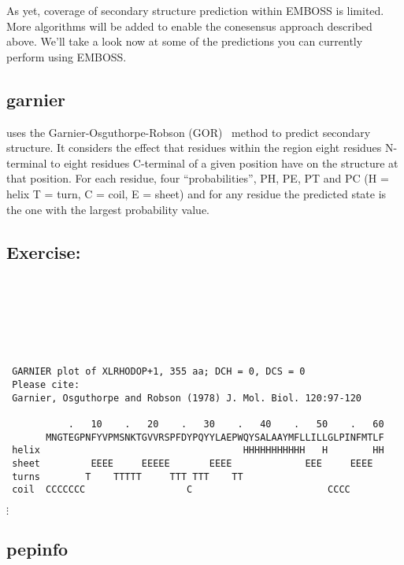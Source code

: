 \documentclass[12pt]{report}
\begin{document}
As yet, coverage of secondary structure prediction within EMBOSS is
limited. More algorithms will be added to enable the conesensus
approach described above. We'll take a look now at some of the
predictions you can currently perform using EMBOSS.

\subsection{garnier}

 uses the Garnier-Osguthorpe-Robson (GOR)~\cite{Garnier:78} 
method to predict 
secondary structure. It considers the effect that residues within the
region eight residues N-terminal to eight residues C-terminal of a
given position have on the structure at that position.  For each
residue, four ``probabilities'', PH, PE, PT and PC (H = helix T = turn,
C = coil, E = sheet) and for any residue the predicted state is the
one with the largest probability value.

\subsection*{Exercise: }

\unix{}\\
\\
\\
\\
\\

\unix{}
\begin{verbatim}
 GARNIER plot of XLRHODOP+1, 355 aa; DCH = 0, DCS = 0
 Please cite:
 Garnier, Osguthorpe and Robson (1978) J. Mol. Biol. 120:97-120

           .   10    .   20    .   30    .   40    .   50    .   60
       MNGTEGPNFYVPMSNKTGVVRSPFDYPQYYLAEPWQYSALAAYMFLLILLGLPINFMTLF
 helix                                    HHHHHHHHHHH   H        HH
 sheet         EEEE     EEEEE       EEEE             EEE     EEEE  
 turns        T    TTTTT     TTT TTT    TT                       
 coil  CCCCCCC                  C                        CCCC    
\end{verbatim}
$\vdots$

\subsection{pepinfo}
\end{document}
